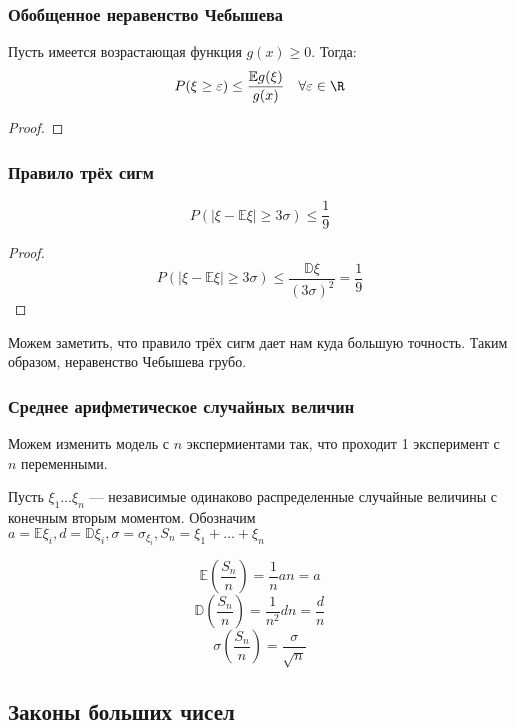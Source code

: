 \subsubsection{Обобщенное неравенство Чебышева}

\begin{theorem}
    Пусть имеется возрастающая функция \(g(x) \geq 0\). Тогда:
    \[P(\xi \geq \varepsilon) \leq \frac{\mathbb{E} g(\xi)}{g(x)} \quad \forall \varepsilon \in \R\]
\end{theorem}
\begin{proof}
    \unfinished
\end{proof}

\subsubsection{Правило трёх сигм}

\begin{theorem}
    \[P(|\xi - \mathbb{E}\xi| \geq 3 \sigma) \leq \frac{1}{9}\]
\end{theorem}
\begin{proof}
    \[P(|\xi - \mathbb{E}\xi| \geq 3 \sigma) \leq \frac{\mathbb{D}\xi}{(3\sigma)^2} = \frac{1}{9}\]
\end{proof}
\begin{remark}
    Можем заметить, что правило трёх сигм дает нам куда большую точность. Таким образом, неравенство Чебышева грубо.
\end{remark}

\subsubsection{Среднее арифметическое случайных величин}

Можем изменить модель с \(n\) экспермиентами так, что проходит 1 эксперимент с \(n\) переменными.

Пусть \(\xi_1 \dots \xi_n\) --- независимые одинаково распределенные случайные величины с конечным вторым моментом. Обозначим \(a = \mathbb{E}\xi_i, d = \mathbb{D}\xi_i, \sigma = \sigma_{\xi_i}, S_n = \xi_1 + \dots + \xi_n\)

\[\mathbb{E}\left( \frac{S_n}{n} \right) = \frac{1}{n} an = a\]
\[\mathbb{D}\left( \frac{S_n}{n} \right) = \frac{1}{n^2} dn = \frac{d}{n}\]
\[\sigma\left( \frac{S_n}{n} \right) = \frac{\sigma}{\sqrt{n}}\]

\subsection{Законы больших чисел}

